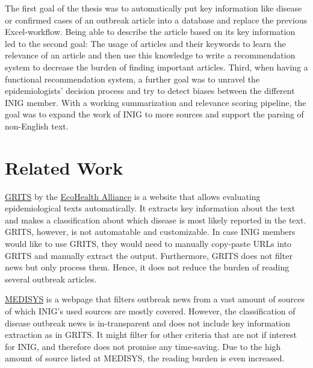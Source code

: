 The first goal of the thesis was to automatically put key information like disease or confirmed cases of an outbreak article into a database and replace the previous Excel-workflow. Being able to describe the article based on its key information led to the second goal: The usage of articles and their keywords to learn the relevance of an article and then use this knowledge to write a recommendation system to decrease the burden of finding important articles.
Third, when having a functional recommendation system, a further goal was to unravel the epidemiologists' decision process and try to detect biases between the different INIG member.
With a working summarization and relevance scoring pipeline, the goal was to expand the work of INIG to more sources and support the parsing of non-English text.


\section{Related Work}
\href{https://grits.eha.io}{GRITS} by the \href{https://www.ecohealthalliance.org}{EcoHealth Alliance} is a website that allows evaluating epidemiological texts automatically. It extracts key information about the text and makes a classification about which disease is most likely reported in the text. GRITS, however, is not automatable and customizable. In case INIG members would like to use GRITS, they would need to manually copy-paste URLs into GRITS and manually extract the output. Furthermore, GRITS does not filter news but only process them. Hence, it does not reduce the burden of reading several outbreak articles.

\href{http://medisys.newsbrief.eu}{MEDISYS} is a webpage that filters outbreak news from a vast amount of sources of which INIG's used sources are mostly covered. However, the classification of disease outbreak news is in-transparent and does not include key information extraction as in GRITS. It might filter for other criteria that are not if interest for INIG, and therefore does not promise any time-saving. Due to the high amount of source listed at MEDISYS, the reading burden is even increased.
